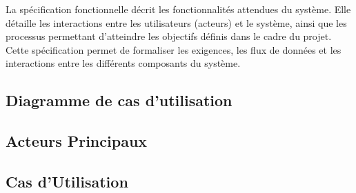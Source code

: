 La spécification fonctionnelle décrit les fonctionnalités attendues du système. Elle détaille les interactions entre les utilisateurs (acteurs) et le système, ainsi que les processus permettant d’atteindre les objectifs définis dans le cadre du projet. Cette spécification permet de formaliser les exigences, les flux de données et les interactions entre les différents composants du système.
\subsection{Diagramme de cas d’utilisation}


\subsection{Acteurs Principaux}


\subsection{Cas d'Utilisation}

